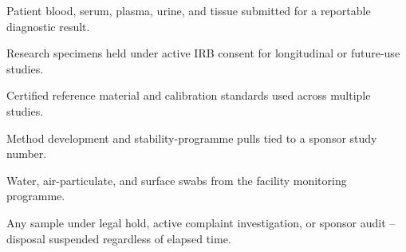 \begin{center}
\begin{minipage}{0.48\textwidth}
\begin{tcolorbox}[colback=paperbg,colframe=deepteal,arc=2pt,boxrule=0.5pt,title={\faVial\ Class A -- Clinical Diagnostic},fonttitle=\bfseries\small\color{white},colbacktitle=deepteal]
\small Patient blood, serum, plasma, urine, and tissue submitted for a reportable diagnostic
result.
\end{tcolorbox}
\end{minipage}\hfill
\begin{minipage}{0.48\textwidth}
\begin{tcolorbox}[colback=paperbg,colframe=deepteal,arc=2pt,boxrule=0.5pt,title={\faSnowflake\ Class B -- Biobank Consented},fonttitle=\bfseries\small\color{white},colbacktitle=deepteal]
\small Research specimens held under active IRB consent for longitudinal or future-use
studies.
\end{tcolorbox}
\end{minipage}
\par\vspace{6pt}
\begin{minipage}{0.48\textwidth}
\begin{tcolorbox}[colback=paperbg,colframe=deepteal,arc=2pt,boxrule=0.5pt,title={\faFlask\ Class C -- Reference Standard},fonttitle=\bfseries\small\color{white},colbacktitle=deepteal]
\small Certified reference material and calibration standards used across multiple studies.
\end{tcolorbox}
\end{minipage}\hfill
\begin{minipage}{0.48\textwidth}
\begin{tcolorbox}[colback=paperbg,colframe=deepteal,arc=2pt,boxrule=0.5pt,title={\faFlask\ Class D -- Stability / R\&D},fonttitle=\bfseries\small\color{white},colbacktitle=deepteal]
\small Method development and stability-programme pulls tied to a sponsor study number.
\end{tcolorbox}
\end{minipage}
\par\vspace{6pt}
\begin{minipage}{0.48\textwidth}
\begin{tcolorbox}[colback=paperbg,colframe=deepteal,arc=2pt,boxrule=0.5pt,title={\faTint\ Class E -- Environmental},fonttitle=\bfseries\small\color{white},colbacktitle=deepteal]
\small Water, air-particulate, and surface swabs from the facility monitoring programme.
\end{tcolorbox}
\end{minipage}\hfill
\begin{minipage}{0.48\textwidth}
\begin{tcolorbox}[colback=paperbg,colframe=clayrust,arc=2pt,boxrule=0.5pt,title={\faExclamationTriangle\ Class F -- Restricted / Hold},fonttitle=\bfseries\small\color{white},colbacktitle=clayrust]
\small Any sample under legal hold, active complaint investigation, or sponsor audit --
disposal suspended regardless of elapsed time.
\end{tcolorbox}
\end{minipage}
\end{center}
